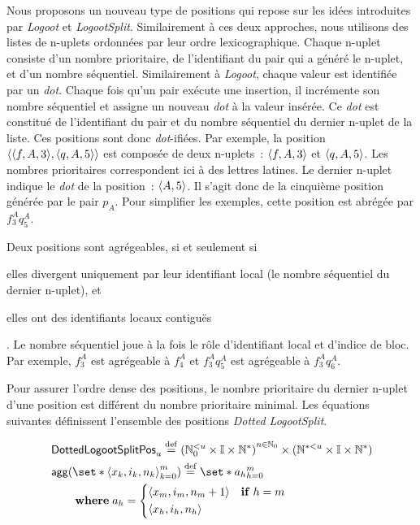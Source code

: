 Nous proposons un nouveau type de positions qui repose sur les idées introduites par \emph{Logoot} et \emph{LogootSplit}.
Similairement à ces deux approches, nous utilisons des listes de n-uplets ordonnées par leur ordre lexicographique.
Chaque n-uplet consiste d'un nombre prioritaire, de l'identifiant du pair qui a généré le n-uplet, et d'un nombre séquentiel. 
Similairement à \emph{Logoot}, chaque valeur est identifiée par un \emph{dot}.
Chaque fois qu'un pair exécute une insertion, il incrémente son nombre séquentiel et assigne un nouveau \emph{dot} à la valeur insérée.
Ce \emph{dot} est constitué de l'identifiant du pair et du nombre séquentiel du dernier n-uplet de la liste.
Ces positions sont donc \emph{dot}-ifiées.
Par exemple, la position $\tuple*{\tuple*{f, A, 3}, \tuple*{q, A, 5}}$ est composée de deux n-uplets~: $\tuple*{f, A, 3}$ et $\tuple*{q, A, 5}$.
Les nombres prioritaires correspondent ici à des lettres latines.
Le dernier n-uplet indique le \emph{dot} de la position~: $\tuple*{A, 5}$.
Il s'agit donc de la cinquième position générée par le pair $p_A$.
Pour simplifier les exemples, cette position est abrégée par $f^A_3q^A_5$.

Deux positions sont agrégeables, si et seulement si \begin{inlinelist}\item elles divergent uniquement par leur identifiant local (le nombre séquentiel du dernier n-uplet), et \item elles ont des identifiants locaux contiguës\end{inlinelist}.
Le nombre séquentiel joue à la fois le rôle d'identifiant local et d'indice de bloc.
Par exemple, $f^A_3$ est agrégeable à $f^A_4$ et $f^A_3q^A_5$ est agrégeable à $f^A_3q^A_6$.

Pour assurer l'ordre dense des positions, le nombre prioritaire du dernier n-uplet d'une position est différent du nombre prioritaire minimal.
Les équations suivantes définissent l'ensemble des positions \emph{Dotted LogootSplit}.

\begin{align}
&\trm{DottedLogootSplitPos}_u \defeq {(\mathbb{N}_0^{< u} \times \mathbb{I} \times \mathbb{N}^*)}^{n \in \mathbb{N}_0} \times (\mathbb{N}^{* < u} \times \mathbb{I} \times \mathbb{N}^*)\\
&\begin{aligned}
    \MoveEqLeft \trm{agg}(\set*{\tuple*{x_k, i_k, n_k}}_{k=0}^m) \defeq \set*{a_h}_{h=0}^m\\
    &\where a_h = \begin{dcases}
        \tuple*{x_m, i_m, n_m + 1} & \when h = m\\
        \tuple*{x_h, i_h, n_h}
    \end{dcases}
\end{aligned}
\end{align}

